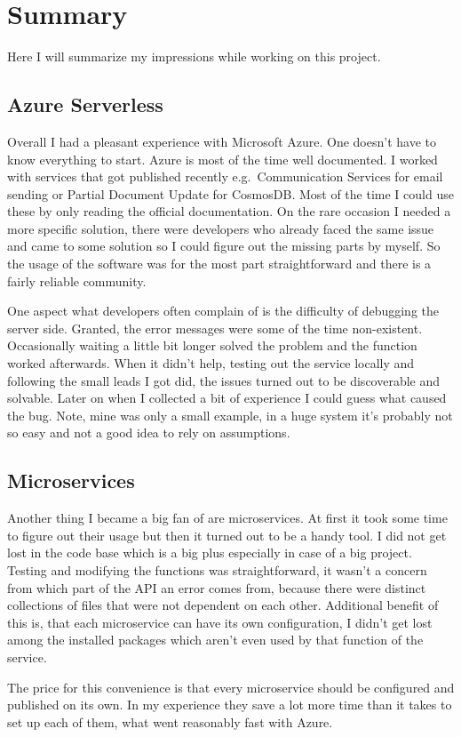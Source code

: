 \chapter{Summary}\label{Ch7}
Here I will summarize my impressions while working on this project.
\section{Azure Serverless}
Overall I had a pleasant experience with Microsoft Azure. One doesn't have to know everything to start. Azure is most of the time well documented. I worked with services that got published recently e.g.\ Communication Services for email sending or Partial Document Update for CosmosDB. Most of the time I could use these by only reading the official documentation. On the rare occasion I needed a more specific solution, there were developers who already faced the same issue and came to some solution so I could figure out the missing parts by myself. So the usage of the software was for the most part straightforward and there is a fairly reliable community.

One aspect what developers often complain of is the difficulty of debugging the server side. Granted, the error messages were some of the time non-existent. Occasionally waiting a little bit longer solved the problem and the function worked afterwards. When it didn't help, testing out the service locally and following the small leads I got did, the issues turned out to be discoverable and solvable. Later on when I collected a bit of experience I could guess what caused the bug. Note, mine was only a small example, in a huge system it's probably not so easy and not a good idea to rely on assumptions.
\section{Microservices}
Another thing I became a big fan of are microservices. At first it took some time to figure out their usage but then it turned out to be a handy tool. I did not get lost in the code base which is a big plus especially in case of a big project. Testing and modifying the functions was straightforward, it wasn't a concern from which part of the API an error comes from, because there were distinct collections of files that were not dependent on each other.
Additional benefit of this is, that each microservice can have its own configuration, I didn't get lost among the installed packages which aren't even used by that function of the service.

The price for this convenience is that every microservice should be configured and published on its own. In my experience they save a lot more time than it takes to set up each of them, what went reasonably fast with Azure.
